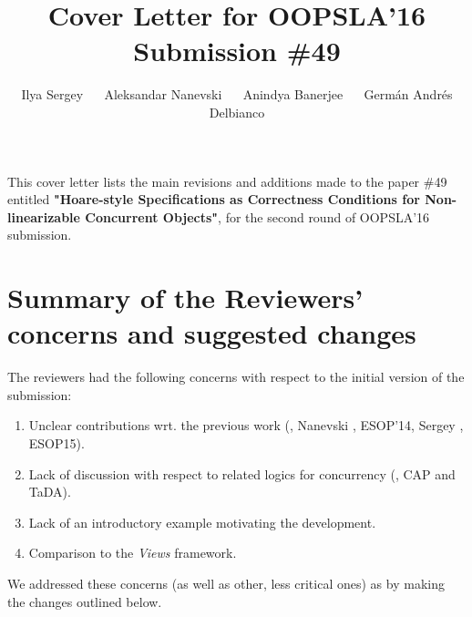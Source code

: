 \documentclass{article}
\begin{document}
\author{Ilya Sergey ~~ Aleksandar Nanevski ~~ Anindya Banerjee ~~
  Germ\'{a}n Andr\'{e}s Delbianco} 









\title{Cover Letter for OOPSLA'16 Submission \#49}

\maketitle

\noindent
%
This cover letter lists the main revisions and additions made to the
paper \#49 entitled \textbf{"Hoare-style Specifications as Correctness Conditions for
    Non-linearizable Concurrent Objects"}, for the second round of
  OOPSLA'16 submission.

\section*{Summary of the Reviewers' concerns and suggested changes}
\label{sec:summ-revi-conerns}

The reviewers had the following concerns with respect to the initial
version of the submission:

\begin{enumerate}
\item Unclear contributions wrt. the previous work
  (\ie, Nanevski \etal, ESOP'14, Sergey \etal, ESOP15).

\item Lack of discussion with respect to related logics for
  concurrency (\eg, CAP and TaDA).

\item Lack of an introductory example motivating the development.

\item Comparison to the \emph{Views} framework.
\end{enumerate}

We addressed these concerns (as well as other, less critical ones) as
by making the changes outlined below.
\end{document}
